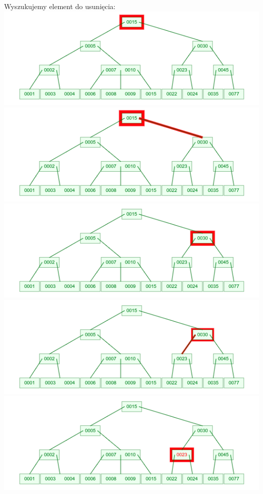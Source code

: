 \documentclass[12pt]{article}
\begin{document}
	\noindent Wyszukujemy element do usunięcia: \\
	\includegraphics[width=\linewidth]{graphics/b-trees/delete/find-01.png} \\
	\includegraphics[width=\linewidth]{graphics/b-trees/delete/find-02.png} \\
	\includegraphics[width=\linewidth]{graphics/b-trees/delete/find-03.png} \\
	\includegraphics[width=\linewidth]{graphics/b-trees/delete/find-04.png} \\
	\includegraphics[width=\linewidth]{graphics/b-trees/delete/find-05.png} \\
\end{document}
